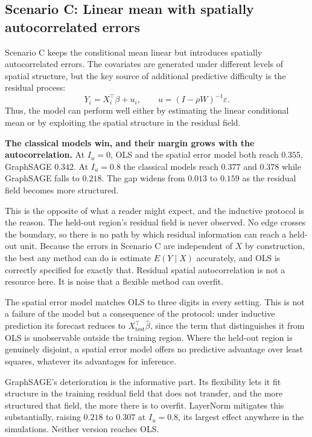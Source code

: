 \documentclass[ASNA, twocolumn]{USG} %
\begin{document}
\subsection{Scenario C: Linear mean with spatially autocorrelated errors}

Scenario C keeps the conditional mean linear but introduces spatially autocorrelated errors. The covariates are generated under different levels of spatial structure, but the key source of additional predictive difficulty is the residual process:
\[
Y_i = X_i^\top\beta + u_i,
\qquad
u = (I-\rho W)^{-1}\varepsilon.
\]
Thus, the model can perform well either by estimating the linear conditional mean or by exploiting the spatial structure in the residual field.

\textbf{The classical models win, and their margin grows with the autocorrelation.} At \(I_u=0\), OLS and the spatial error model both reach \(0.355\), GraphSAGE \(0.342\). At \(I_u=0.8\) the classical models reach \(0.377\) and \(0.378\) while GraphSAGE falls to \(0.218\). The gap widens from \(0.013\) to \(0.159\) as the residual field becomes more structured.

This is the opposite of what a reader might expect, and the inductive protocol is the reason. The held-out region's residual field is never observed. No edge crosses the boundary, so there is no path by which residual information can reach a held-out unit. Because the errors in Scenario C are independent of \(X\) by construction, the best any method can do is estimate \(E(Y \mid X)\) accurately, and OLS is correctly specified for exactly that. Residual spatial autocorrelation is not a resource here. It is noise that a flexible method can overfit.

The spatial error model matches OLS to three digits in every setting. This is not a failure of the model but a consequence of the protocol: under inductive prediction its forecast reduces to \(X_{\text{test}}^\top\hat\beta\), since the term that distinguishes it from OLS is unobservable outside the training region. Where the held-out region is genuinely disjoint, a spatial error model offers no predictive advantage over least squares, whatever its advantages for inference.

GraphSAGE's deterioration is the informative part. Its flexibility lets it fit structure in the training residual field that does not transfer, and the more structured that field, the more there is to overfit. LayerNorm mitigates this substantially, raising \(0.218\) to \(0.307\) at \(I_u=0.8\), its largest effect anywhere in the simulations. Neither version reaches OLS.
\end{document}
